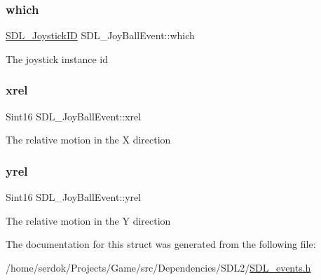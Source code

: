 \subsubsection{\texorpdfstring{which}{which}}
{\footnotesize\ttfamily \hyperlink{SDL__joystick_8h_a3c3d32500cb08f76ee8077983912c0bd}{S\+D\+L\+\_\+\+Joystick\+ID} S\+D\+L\+\_\+\+Joy\+Ball\+Event\+::which}

The joystick instance id \mbox{\label{structSDL__JoyBallEvent_a959a8473aa1964e5e1778c27a9ffd261}} 
\subsubsection{\texorpdfstring{xrel}{xrel}}
{\footnotesize\ttfamily Sint16 S\+D\+L\+\_\+\+Joy\+Ball\+Event\+::xrel}

The relative motion in the X direction \mbox{\label{structSDL__JoyBallEvent_a28ad48a9eb7a5d3ff62ccba09fcead76}} 
\subsubsection{\texorpdfstring{yrel}{yrel}}
{\footnotesize\ttfamily Sint16 S\+D\+L\+\_\+\+Joy\+Ball\+Event\+::yrel}

The relative motion in the Y direction 

The documentation for this struct was generated from the following file\+:\begin{DoxyCompactItemize}
\item 
/home/serdok/\+Projects/\+Game/src/\+Dependencies/\+S\+D\+L2/\hyperlink{SDL__events_8h}{S\+D\+L\+\_\+events.\+h}\end{DoxyCompactItemize}
